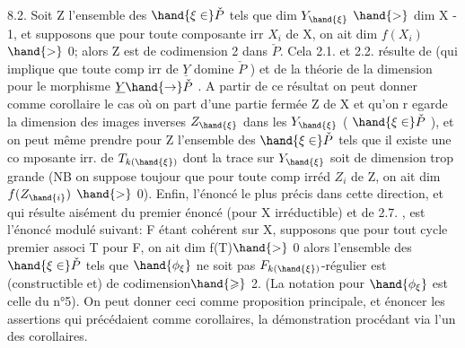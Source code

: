 
8.2. Soit Z l'ensemble des $\hand{\xi\in}\check{P}$ tels que dim $Y_{\hand{\xi}}$ $\hand{>}$ dim X - 1,\hand{\unsure{\xi}}
et supposons que pour toute composante irr $X_i$ de X, on ait dim $f(X_i)$ $\hand{>}$ 0;
alors Z est de codimension 2 dans $\check{P}$.  Cela
2.1. et 2.2.
résulte de 
 (qui implique que toute comp irr de $\underline{Y}$ domine $\check{P}$ ) et de
la théorie de la dimension pour le morphisme $\underline{Y} \hand{\to} \check{P}$ . A partir de ce
résultat  on peut donner comme corollaire le cas où on
part d'une partie fermée  Z de X et qu'on r egarde la dimension des
images inverses $Z_{\hand{\xi}}$ dans les $Y_{\hand{\xi}}$ ( $\hand{\xi\in}\check{P}$ ), et on peut même prendre pour
Z l'ensemble des $\hand{\xi\in}\check{P}$ tels que il existe une co mposante irr. de $T_{k(\hand{\xi})}$
dont la trace sur $Y_{\hand{\xi}}$ soit de dimension trop grande (NB on suppose toujour
que pour toute comp irréd $Z_i$ de Z, on ait dim $f(Z_{\hand{i}})$ $\hand{>}$ 0). Enfin, l'énoncé
le plus précis dans cette direction, et qui résulte aisément du premier
énoncé (pour X irréductible) et de 2.7. , est l'énoncé modulé suivant:
F étant cohérent sur X,  supposons que pour tout cycle premier associ
T pour F, on ait dim f(T)$\hand{>}$ 0\unsure{;} alors l'ensemble des $\hand{\xi\in}\check{P}$ tels que
$\hand{\phi_\xi}$ ne soit pas $F_{k(\hand{\xi})}$-régulier est (constructible et) de codimension$\hand{\geqslant}$ 2.
\placedmargin{\textbar} (La notation pour $\hand{\phi_\xi}$ est celle du n°5). On peut donner ceci comme
\placedmargin{\textbar} proposition principale, et énoncer les  assertions qui précédaient
\placedmargin{\textbar} comme corollaires, la démonstration procédant via l'un des corollaires.



